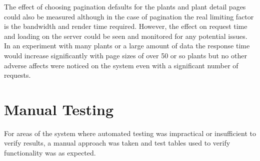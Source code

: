 The effect of choosing pagination defaults for the plants and plant detail pages could also be measured although in the case of pagination the real limiting factor is the bandwidth and render time required. However, the effect on request time and loading on the server could be seen and monitored for any potential issues. In an experiment with many plants or a large amount of data the response time would increase significantly with page sizes of over 50 or so plants but no other adverse affects were noticed on the system even with a significant number of requests.



\section{Manual Testing}
For areas of the system where automated testing was impractical or insufficient to verify results, a manual approach was taken and test tables used to verify functionality was as expected. 

